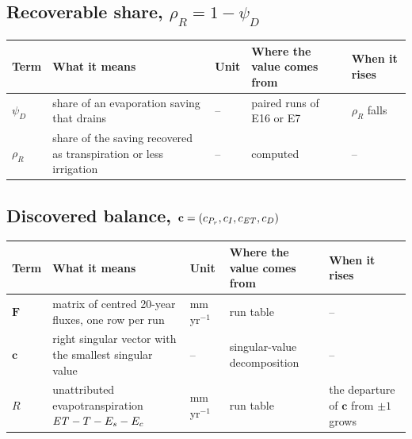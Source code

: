\subsection*{Recoverable share, $\rho_R=1-\psi_D$}
{\small\begin{longtable}{>{\raggedright\arraybackslash}p{}>{\raggedright\arraybackslash}p{}>{\raggedright\arraybackslash}p{}>{\raggedright\arraybackslash}p{}>{\raggedright\arraybackslash}p{}}\toprule Term & What it means & Unit & Where the value comes from & When it rises\\\midrule\endhead
$\psi_D$ & share of an evaporation saving that drains & -- & paired runs of E16 or E7 & $\rho_R$ falls\\
$\rho_R$ & share of the saving recovered as transpiration or less irrigation & -- & computed & --\\
\bottomrule\end{longtable}}
\subsection*{Discovered balance, $\mathbf c=(c_{P_r},c_I,c_{\mathit{ET}},c_D)$}
{\small\begin{longtable}{>{\raggedright\arraybackslash}p{}>{\raggedright\arraybackslash}p{}>{\raggedright\arraybackslash}p{}>{\raggedright\arraybackslash}p{}>{\raggedright\arraybackslash}p{}}\toprule Term & What it means & Unit & Where the value comes from & When it rises\\\midrule\endhead
$\mathbf F$ & matrix of centred 20-year fluxes, one row per run & mm\,yr$^{-1}$ & run table & --\\
$\mathbf c$ & right singular vector with the smallest singular value & -- & singular-value decomposition & --\\
$R$ & unattributed evapotranspiration $\mathit{ET}-T-E_s-E_c$ & mm\,yr$^{-1}$ & run table & the departure of $\mathbf c$ from $\pm1$ grows\\
\bottomrule\end{longtable}}
